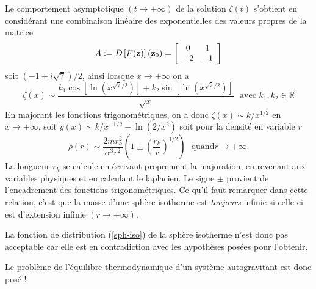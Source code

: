 Le comportement asymptotique $\left(t\rightarrow+\infty\right)$ de la
solution $\zeta(t)$ s'obtient en consid\'{e}rant une combinaison lin\'{e}aire
des exponentielles des valeurs propres de la matrice
\begin{align*}
	A:=D\left[F(\mathbf{z})\right](\mathbf{z}_0)=\left[
\begin{array}
[c]{cc}%
0     & 1\\
-2 & -1\\
\end{array}
\right]
\end{align*}
soit $\left(  -1\pm i\sqrt
{7}\right)  /2$, ainsi lorsque $x\rightarrow+\infty$ on a
\[
\zeta\left(  x\right)
\sim\frac{k_{1}\cos\left[  \ln\left(  x^{\sqrt{7}/2}\right)  \right]
+k_{2}\sin\left[  \ln\left(  x^{\sqrt{7}/2}\right)  \right]  }{\sqrt{x}%
}\ \ \ \text{avec }k_{1},k_{2}\in\mathbb{R}%
\]
En majorant les fonctions trigonom\'{e}triques, on a donc $\zeta\left(
x\right)  \sim k/x^{1/2}$ en $x\rightarrow+\infty$, soit $y\left(  x\right)
\sim k/x^{-1/2}-\ln\left(  2/x^{2}\right)  $ soit pour la densit\'{e} en
variable $r$%
\begin{equation}
\rho\left(  r\right)  \sim\frac{2mr_{o}^{2}}{\alpha^{3}r^{2}}\left(
1\pm\left(  \frac{r_{k}}{r}\right)  ^{1/2}\right)  \ \ \ \text{quand
}r\rightarrow+\infty\text{.}\label{asymp_sph_iso}%
\end{equation}
La longueur $r_{k}$ se calcule en \'{e}crivant proprement la majoration, en
revenant aux variables physiques et en calculant le laplacien. Le signe $\pm$ provient de l'encadrement des fonctions
trigonom\'{e}triques. Ce qu'il faut remarquer dans cette
relation, c'est que la masse d'une sph\`{e}re isotherme est \emph{toujours} infinie si
celle-ci est d'extension infinie $\left(  r\rightarrow+\infty\right)$.

La fonction de distribution (\ref{sph-iso}) de la sph\`{e}re isotherme n'est donc pas acceptable car elle est en contradiction avec les hypothèses posées pour l'obtenir.

 Le probl\`{e}me de l'\'{e}quilibre thermodynamique d'un syst\`{e}me autogravitant est donc pos\'{e} !

